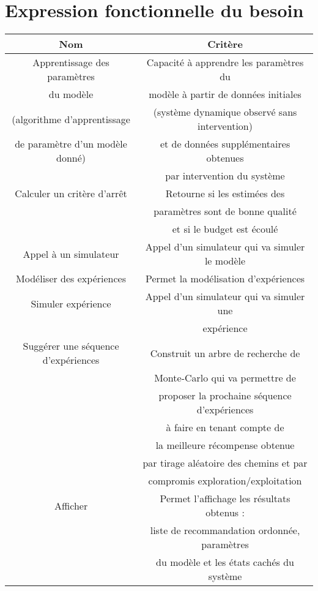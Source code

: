 \documentclass{report}
\begin{document}
\chapter{Expression fonctionnelle du besoin}
\begin{tabular}{|c|c|}
	\hline
	\textbf{Nom} & \textbf{Critère} \\
	\hline
	Apprentissage des paramètres &Capacité à apprendre les 			paramètres du\\
	du modèle&modèle à partir de données initiales\\
	(algorithme d'apprentissage&(système dynamique observé sans intervention)\\
	 de paramètre d'un modèle donné)&et de données supplémentaires obtenues\\
	 &par intervention du système\\
	\hline
	Calculer un critère d'arrêt&Retourne si les estimées des\\
	&paramètres sont de bonne qualité\\
	&et si le budget est écoulé\\
	\hline
	Appel à un simulateur& Appel d'un simulateur qui va simuler le modèle\\
	\hline
	Modéliser des expériences&Permet la modélisation d'expériences\\
	\hline
	Simuler expérience&Appel d'un simulateur qui va simuler une\\
	&expérience\\
	\hline
	Suggérer une séquence d'expériences&Construit un arbre de recherche de\\
	& Monte-Carlo qui va permettre de\\
	&proposer la prochaine séquence d'expériences\\
	&à faire en tenant compte de\\
	&la meilleure récompense obtenue\\
	&par tirage aléatoire des chemins et par\\
	&compromis exploration/exploitation\\
	\hline
	Afficher & Permet l'affichage les résultats obtenus :\\
	& liste de recommandation ordonnée, paramètres\\
	&du modèle et les états cachés du système\\
	\hline
	

\end{tabular}
\end{document}
